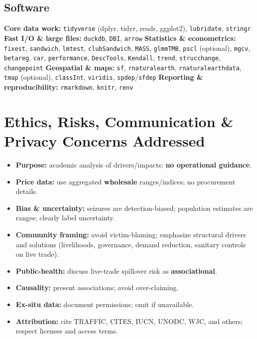 \documentclass[
]{article}
\providecommand{\tightlist}{%
  \setlength{\itemsep}{0pt}\setlength{\parskip}{0pt}}
\begin{document}
\subsection{Software}\label{software}

\textbf{Core data work:} \texttt{tidyverse} (dplyr, tidyr, readr,
ggplot2), \texttt{lubridate}, \texttt{stringr} \textbf{Fast I/O \& large
files:} \texttt{duckdb}, \texttt{DBI}, \texttt{arrow} \textbf{Statistics
\& econometrics:} \texttt{fixest}, \texttt{sandwich}, \texttt{lmtest},
\texttt{clubSandwich}, \texttt{MASS}, \texttt{glmmTMB}, \texttt{pscl}
(optional), \texttt{mgcv}, \texttt{betareg}, \texttt{car},
\texttt{performance}, \texttt{DescTools}, \texttt{Kendall},
\texttt{trend}, \texttt{strucchange}, \texttt{changepoint}
\textbf{Geospatial \& maps:} \texttt{sf}, \texttt{rnaturalearth},
\texttt{rnaturalearthdata}, \texttt{tmap} (optional), \texttt{classInt},
\texttt{viridis}, \texttt{spdep}/\texttt{sfdep} \textbf{Reporting \&
reproducibility:} \texttt{rmarkdown}, \texttt{knitr}, \texttt{renv}

\section{Ethics, Risks, Communication \& Privacy Concerns
Addressed}\label{ethics-risks-communication-privacy-concerns-addressed}

\begin{itemize}
\tightlist
\item
  \textbf{Purpose:} academic analysis of drivers/impacts; \textbf{no
  operational guidance}.
\item
  \textbf{Price data:} use aggregated \textbf{wholesale} ranges/indices;
  no procurement details.
\item
  \textbf{Bias \& uncertainty:} seizures are detection-biased;
  population estimates are ranges; clearly label uncertainty.
\item
  \textbf{Community framing:} avoid victim-blaming; emphasize structural
  drivers and solutions (livelihoods, governance, demand reduction,
  sanitary controls on live trade).
\item
  \textbf{Public-health:} discuss live-trade spillover risk as
  \textbf{associational}.
\item
  \textbf{Causality:} present associations; avoid over-claiming.
\item
  \textbf{Ex-situ data:} document permissions; omit if unavailable.
\item
  \textbf{Attribution:} cite TRAFFIC, CITES, IUCN, UNODC, WJC, and
  others; respect licenses and access terms.
\end{itemize}
\end{document}
